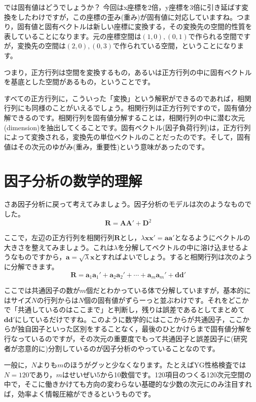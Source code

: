 \documentclass{ltjsbook}
\begin{document}
では固有値はどうでしょうか？ 今回はx座標を2倍，y座標を3倍に引き延ばす変換をしたわけですが，この座標の歪み(重み)が固有値に対応していますね。つまり，固有値と固有ベクトルは新しい座標に変換する，その変換先の空間的性質を表していることになります。元の座標空間は$(1,0),(0,1)$で作られる空間ですが，変換先の空間は$(2,0),(0,3)$で作られている空間，ということになります。

つまり，正方行列は空間を変換するもの，あるいは正方行列の中に固有ベクトルを基底とした空間があるもの，ということです。

すべての正方行列に，こういった「変換」という解釈ができるのであれば，相関行列にも同様のことがいえるでしょう。相関行列は正方行列ですので，固有値分解できるのです。相関行列を固有値分解することは，相関行列の中に潜む次元(dimension)を抽出してくることです。固有ベクトル(因子負荷行列)は，正方行列によって変換される，変換先の単位ベクトルのことだったのです。そして，固有値はその次元のゆがみ(重み，重要性)という意味があったのです。

\section{因子分析の数学的理解}
さあ因子分析に戻って考えてみましょう。因子分析のモデルは次のようなものでした。
\begin{equation}
	\bm{R} = \bm{A} \bm{A} ' + \bm{D}^2
\end{equation}

ここで，左辺の正方行列を相関行列$\bm{R}$とし，$\lambda \bm{xx'} = \bm{aa'}$となるようにベクトルの大きさを整えてみましょう。これは$\lambda$を分解してベクトルの中に溶け込ませるようなものですから，$\bm{a} = \sqrt{\lambda}\bm{x}$とすればよいでしょう。すると相関行列は次のように分解できます。
\begin{equation}
	\bm{R}=\bm{a}_1\bm{a}_1'+\bm{a}_2\bm{a}_2'+\cdots +\bm{a}_m\bm{a}_m'+\bm{d} \bm{d}'
\end{equation}

ここでは共通因子の数が$m$個だとわかっている体で分解していますが，基本的にはサイズ$N$の行列からは$N$個の固有値がずらーっと並ぶわけです。それをどこかで「共通しているのはここまで」と判断し，残りは誤差であるとしてまとめて$\bm{dd'}$にしているだけですね。このように数学的にはここからが共通因子，ここからが独自因子といった区別をすることなく，最後のひとかけらまで固有値分解を行なっているのですが，その次元の重要度でもって共通因子と誤差因子に(研究者が恣意的に)分割しているのが因子分析のやっていることなのです。

一般に，$N$よりも$m$のほうがグッと少なくなります。たとえばYG性格検査では$N=120$であり，$m$はせいぜい5から10数個です。120項目のつくる120次元空間の中で，そこに働きかけても方向の変わらない基礎的な少数の次元にのみ注目すれば，効率よく情報圧縮ができるというものです。
\end{document}
